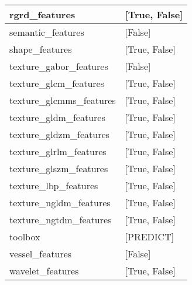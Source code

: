 \begin{table}[]
\begin{tabular}{l|l}
rgrd\_features & {[True, False]} \\ \hline
semantic\_features & {[False]} \\ \hline
shape\_features & {[True, False]} \\ \hline
texture\_gabor\_features & {[False]} \\ \hline
texture\_glcm\_features & {[True, False]} \\ \hline
texture\_glcmms\_features & {[True, False]} \\ \hline
texture\_gldm\_features & {[True, False]} \\ \hline
texture\_gldzm\_features & {[True, False]} \\ \hline
texture\_glrlm\_features & {[True, False]} \\ \hline
texture\_glszm\_features & {[True, False]} \\ \hline
texture\_lbp\_features & {[True, False]} \\ \hline
texture\_ngldm\_features & {[True, False]} \\ \hline
texture\_ngtdm\_features & {[True, False]} \\ \hline
toolbox & {[PREDICT]} \\ \hline
vessel\_features & {[False]} \\ \hline
wavelet\_features & {[True, False]} \\ \hline

\end{tabular}
\end{table}
